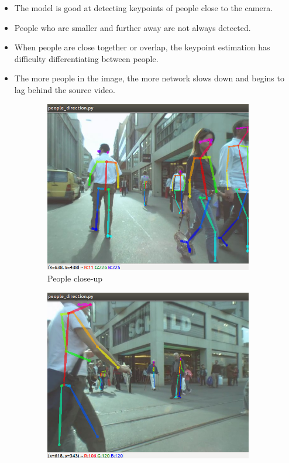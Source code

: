 \begin{itemize}
	\item The model is good at detecting keypoints of people close to the camera.
	\item People who are smaller and further away are not always detected.
	\item When people are close together or overlap, the keypoint estimation has difficulty differentiating between people.
	\item The more people in the image, the more network slows down and begins to lag behind the source video.
\end{itemize}

\begin{figure}[ht]
	\begin{subfigure}[b]{.32\textwidth}
		\centering
		\includegraphics[width=1.0\linewidth]{img/chapter5_implementation/openposeKP.png}
		\caption{People close-up}
	\end{subfigure}%
	\hspace{\fill} 
	\begin{subfigure}[b]{.32\textwidth}
		\centering
		\includegraphics[width=1.0\linewidth]{img/chapter5_implementation/openposeKP1.png}

\end{subfigure}
\end{figure}
